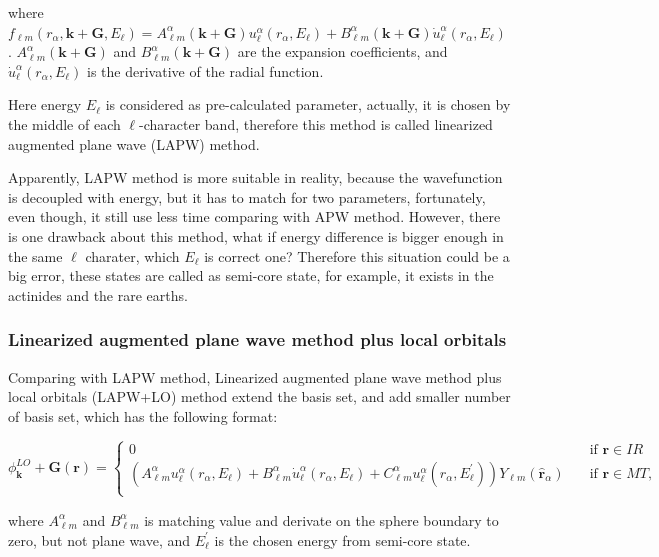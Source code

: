 \documentclass[a4paper, 12pt, titlepage,oneside,drop]{kthesis}
\begin{document}
where $f_{{\ell}{m}} (r_{\alpha},\textbf{k}+\textbf{G} ,E_{\ell}) =  A _{{\ell}m}^{\alpha} (\textbf {k}+\textbf{G}) u_{{\ell}}^{\alpha}(r_{\alpha}, E_{\ell}) + B _{{\ell}m}^{\alpha} (\textbf {k}+\textbf{G}) \dot{u}_{{\ell}}^{\alpha}(r_{\alpha}, E_{\ell})$
. $A _{{\ell}m}^{\alpha} (\textbf {k}+\textbf{G})$ and $B _{{\ell}m}^{\alpha} (\textbf {k}+\textbf{G})$ are the expansion coefficients, and $\dot{u}_{{\ell}}^{\alpha}(r_{\alpha}, E_{\ell} )$ is the derivative of the radial function.

Here energy $E_{\ell}$  is considered as pre-calculated parameter, actually, it is chosen by the middle of  each $\ell$-character band, therefore this method is called linearized augmented plane wave (LAPW) method.

Apparently, LAPW method is more suitable in reality, because the wavefunction is decoupled with energy, but it has to match for two parameters,
fortunately, even though, it still use less time comparing with APW method. However, there is one drawback about this method, what if energy difference is bigger enough in the same $ {\ell} $ charater, 
which $E_{\ell}$ is correct one? Therefore this situation could be a big error, these states are called as semi-core state, for example, it exists in the actinides and the rare earths.

\subsubsection{Linearized augmented plane wave method plus local orbitals}
Comparing with LAPW method, Linearized augmented plane wave method plus local orbitals (LAPW+LO) method extend the basis set, and add smaller number of basis set, which has the following format:


\begin{equation}\label{lap5}
\phi^{LO}_\textbf{k}+\textbf{G} (\textbf{r}) = 
\begin{cases} 0 & \quad \mbox{if $\textbf{r} \in IR $}
\\
(A _{{\ell}m}^{\alpha}  u_{{\ell}}^{\alpha}(r_{\alpha}, E_{\ell}) + B _{{\ell}m}^{\alpha}  \dot{u}_{{\ell}}^{\alpha}(r_{\alpha}, E_{\ell}) + C _{{\ell}m}^{\alpha}  u_{{\ell}}^{\alpha}(r_{\alpha}, E^{\prime}_{\ell})){Y_{{\ell}m}(\hat{\textbf{r}}_{\alpha})} & \quad \mbox{if $\textbf{r} \in MT, $}\\ 
\end{cases}
\end{equation}
 
where $A _{{\ell}m}^{\alpha}$ and $B _{{\ell}m}^{\alpha}$ is matching value and derivate on the sphere boundary to zero, but not plane wave, and $E^{\prime}_{\ell}$ is
the chosen energy from semi-core state.
\end{document}
